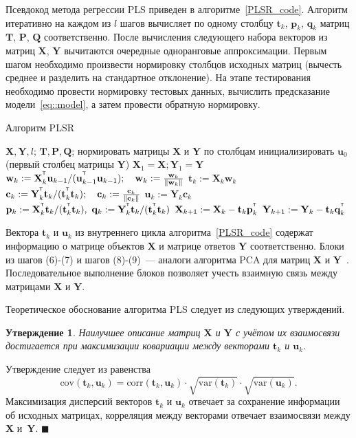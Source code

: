 \documentclass[12pt,twoside]{article}
\newtheorem{statement}{Утверждение}
\newcommand{\bw}{\mathbf{w}}
\newcommand{\bY}{\mathbf{Y}}
\newcommand{\bX}{\mathbf{X}}
\newcommand{\bu}{\mathbf{u}}
\newcommand{\bt}{\mathbf{t}}
\newcommand{\bp}{\mathbf{p}}
\newcommand{\bq}{\mathbf{q}}
\newcommand{\bc}{\mathbf{c}}
\newcommand{\bP}{\mathbf{P}}
\newcommand{\bT}{\mathbf{T}}
\newcommand{\bQ}{\mathbf{Q}}
\newcommand{\T}{^{\text{\tiny\sffamily\upshape\mdseries T}}}
\begin{document}
Псевдокод метода регрессии PLS приведен в алгоритме~\ref{PLSR_code}.
Алгоритм итеративно на каждом из $l$ шагов вычисляет по одному столбцу $\bt_k$, $\bp_k$, $\bq_k$ матриц $\bT$, $\bP$, $\bQ$ соответственно. После вычисления следующего набора векторов из матриц $\bX$, $\bY$ вычитаются очередные одноранговые аппроксимации. 
Первым шагом необходимо произвести нормировку столбцов исходных матриц (вычесть среднее и разделить на стандартное отклонение).
На этапе тестирования необходимо провести нормировку тестовых данных, вычислить предсказание модели~\ref{eq::model}, а затем провести обратную нормировку.

\begin{algorithm}[h]
\caption{Алгоритм PLSR}
\label{PLSR_code}
\begin{algorithmic}[1]
	\REQUIRE $\bX, \bY, l$;
	\ENSURE $\bT, \bP, \bQ$;
	\STATE нормировать матрицы $\bX$ и $\bY$ по столбцам
	\STATE инициализировать $\bu_0$ (первый столбец матрицы $\bY$)
	\STATE $\bX_1 = \bX; \bY_1 = \bY$
	\REPEAT
	\vspace{0.1cm}
	\STATE $\bw_k := \bX_k^{\T} \bu_{k-1} / (\bu_{k-1}^{\T} \bu_{k-1}); \quad \bw_k: = \frac{\bw_k}{\| \bw_k \|}$
	\vspace{0.1cm}
	\STATE $\bt_k := \bX_k \bw_k$
	\vspace{0.1cm}
	\STATE $\bc_k := \bY_k^{\T} \bt_k / (\bt_k^{\T} \bt_k); \quad \bc_k: = \frac{\bc_k}{\| \bc_k \|}$
	\vspace{0.1cm}
	\STATE $\bu_k := \bY_k \bc_k$
	\UNTIL{$\bt_k$ не стабилизируется}
	\vspace{0.1cm}
	\STATE $\bp_k:= \bX_k^{\T}\bt_k/(\bt_k^{\T}\bt_k),\ 
	\bq_k := \bY_k^{\T}\bt_k/(\bt_k^{\T}\bt_k)$
	\vspace{0.2cm}
	\STATE $\bX_{k+1} :=  \bX_k - \bt_k \bp_k^{\T}$
	\vspace{0.2cm}
	\STATE $\bY_{k + 1} :=  \bY_k - \bt_k \bq_k^{\T}$ 
	\ENDFOR
\end{algorithmic}
\end{algorithm}
Вектора $\bt_k$ и $\bu_k$ из внутреннего цикла алгоритма~\ref{PLSR_code}
содержат информацию о матрице объектов $\bX$ и матрице ответов $\bY$ соответственно. 
Блоки из шагов (6)-(7) и шагов (8)-(9)~--- аналоги алгоритма PCA для матриц $\bX$ и $\bY$~\cite{geladi1986partial}. 
Последовательное выполнение блоков позволяет учесть взаимную связь между матрицами $\bX$ и $\bY$.

Теоретическое обоснование алгоритма PLS следует из следующих утверждений.
\begin{statement}
Наилучшее описание матриц $\bX$ и $\bY$ с учётом их взаимосвязи достигается при максимизации ковариации между векторами $\bt_k$ и $\bu_k$. 
\end{statement}
Утверждение следует из равенства
\[
\text{cov} (\bt_k, \bu_k) = \text{corr} (\bt_k, \bu_k) \cdot \sqrt{\text{var}(\bt_k)} \cdot \sqrt{\text{var}(\bu_k)}.
\]
Максимизация дисперсий векторов $\bt_k$ и $\bu_k$ отвечает за сохранение информации об исходных матрицах, 
корреляция между векторами отвечает взаимосвязи между $\bX$ и~$\bY$. $\blacksquare$
\end{document}
